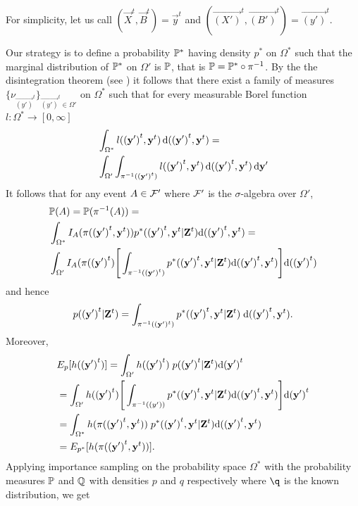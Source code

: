 For simplicity, let us call $(\vec{X}^{t}, \vec{B}^{t}) = \vec{y}^{t}$ and $(\vec{(X')}^{t}, \vec{(B')}^{t}) = \vec{(y')}^{t}$.

Our strategy is to define a probability $\P^*$ having density $p^*$ on $\Omega^*$ such that the marginal distribution of $\P^*$ on $\Omega'$ is $\P$, that is $\P = \P^* \circ \pi^{-1}$. By the the disintegration theorem (see \cite{Rohlin}) it follows that there exist a family of measures $\{ \nu_{\vec{(y')}^t} \}_{\vec{(y')}^t \in \Omega'}$ on $\Omega^*$ such that for every measurable Borel function $l:\Omega^* \rightarrow [0, \infty]$
\begin{align*}
    &\int_{\Omega^*} l(\vec{(y')}^t, \vec{y}^t)\diff (\vec{(y')}^t,\vec{y}^t) = \\
    & \int_{\Omega'}\int_{\pi^{-1}(\vec{(y')}^t)} l(\vec{(y')}^t, \vec{y}^t) \diff (\vec{(y')}^t, \vec{y}^t) \diff \vec{\vec{y'}}
\end{align*}
It follows that for any event $A \in \F'$ where $\F'$ is the $\sigma$-algebra over $\Omega'$,
\begin{align*}
    &\P(A) = \P(\pi^{-1}(A)) = \\
    &\int_{\Omega^*} I_A(\pi(\vec{(y')}^t, \vec{y}^t)) p^*(\vec{(y')}^t, \vec{y}^t | \vec{Z}^t) \D (\vec{(y')}^t, \vec{y}^t) = \\
    & \int_{\Omega'} I_A(\pi(\vec{(y')}^t) \Bigg[ \int_{\pi^{-1}(\vec{(y')}^t)} p^*(\vec{(y')}^t, \vec{y}^t | \vec{Z}^t) \D (\vec{(y')}^t, \vec{y}^t) \Bigg] \D (\vec{(y')}^t)
\end{align*}
and hence
\begin{equation*}
    p(\vec{(y')}^t | \vec{Z}^t) = \int_{\pi^{-1}((\vec{y}')^t)} p^*(\vec{(y')}^t, \vec{y}^t | \vec{Z}^t)\; \D (\vec{(y')}^t, \vec{y}^t).
\end{equation*}
Moreover,
\begin{align*}
    &E_{p}[h(\vec{(y')}^{t})]  = \int_{\Omega'} h(\vec{(y')}^{t})\; p(\vec{(y')}^{t} | \vec{Z}^{t}) \D \vec{(y')}^{t} \\
    &= \int_{\Omega'} h(\vec{(y')}^{t})\Bigg[\int_{\pi^{-1}(\vec(y'))} p^*(\vec{(y')}^{t}, \vec{y}^{t} | \vec{Z}^{t}) \D (\vec{(y')}^t, \vec{y}^t) \Bigg] \D \vec{(y')}^{t} \\ 
    &= \int_{\Omega^*} h(\pi(\vec{(y')}^{t}, \vec{y}^{t}))\; p^*(\vec{(y')}^{t}, \vec{y}^{t} | \vec{Z}^{t}) \D (\vec{(y')}^t, \vec{y}^t) \\ 
    &= E_{p^*}[h(\pi (\vec{(y')}^{t}, \vec{y}^{t}))].
\end{align*}
Applying importance sampling on the probability space $\Omega^*$ with the probability measures $\P$ and $\Q$ with densities $p$ and $q$ respectively where $\q$ is the known distribution, we get

